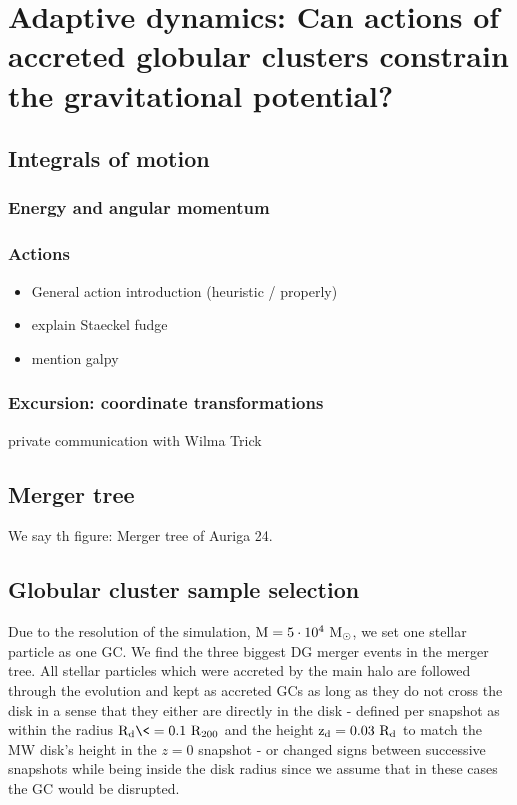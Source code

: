 \section{Adaptive dynamics: Can actions of accreted globular clusters constrain the gravitational potential?}
\subsection{Integrals of motion}

\subsubsection{Energy and angular momentum}
\subsubsection{Actions}
\begin{itemize}
    \item General action introduction (heuristic / properly)
    \item explain Staeckel fudge
    \item mention galpy
    
\end{itemize}

\subsubsection{Excursion: coordinate transformations}
private communication with Wilma Trick
\subsection{Merger tree}
We say th
figure: Merger tree of Auriga 24. 
\subsection{Globular cluster sample selection}
Due to the resolution of the simulation, $\rm{M} = 5 \cdot 10 ^ 4\ M_{\odot}$, we set one stellar particle as one \ac{GC}. We find the three biggest \ac{DG} merger events in the merger tree. All stellar particles which were accreted by the main halo are followed through the evolution and kept as accreted \acp{GC} as long as they do not cross the disk in a sense that they either are directly in the disk - defined per snapshot as within the radius $\rm{R}_d \<= 0.1 \ R_{200}$ and the height $\rm{z}_d = 0.03\ R_d$ to match the \ac{MW} disk's height in the $z = 0$ snapshot - or changed signs between successive snapshots while being inside the disk radius since we assume that in these cases the \ac{GC} would be disrupted. 


